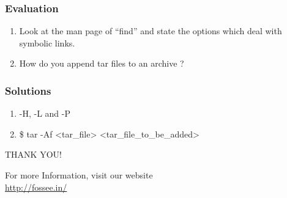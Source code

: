 \documentclass[17pt,compress]{beamer}
\begin{document}
\begin{frame}[fragile]
\frametitle{Evaluation}
\label{sec-9}


\begin{enumerate}
\item Look at the man page of ``find'' and state the options which
    deal with symbolic links.
\vspace{8pt}
\item How do you append tar files to an archive ?
\end{enumerate}
\end{frame}
\begin{frame}
\frametitle{Solutions}

\begin{enumerate}
\item  -H,  -L  and  -P   
\vspace{15pt}
\item \$ tar -Af <tar\_file> <tar\_file\_to\_be\_added>
\end{enumerate}

\end{frame}
\begin{frame}

  \begin{block}{}
  \begin{center}
  {\Large THANK YOU!} 
  \end{center}
  \end{block}
\begin{block}{}
  \begin{center}
    For more Information, visit our website\\
    {\color{blue}\url{http://fossee.in/}}
  \end{center}  
  \end{block}
\end{frame}
\end{document}
